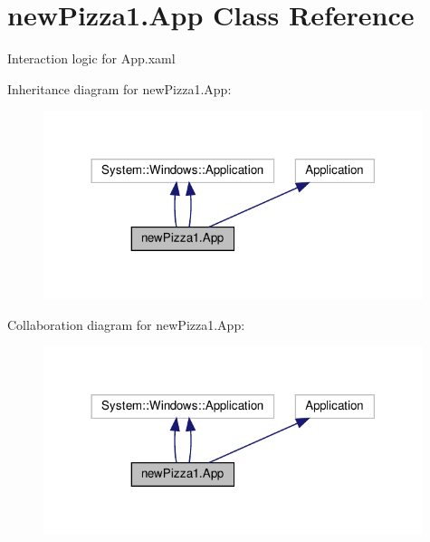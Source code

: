 \hypertarget{classnewPizza1_1_1App}{}\section{new\+Pizza1.\+App Class Reference}
\label{classnewPizza1_1_1App}


Interaction logic for App.\+xaml  




Inheritance diagram for new\+Pizza1.\+App\+:
\nopagebreak
\begin{figure}[H]
\begin{center}
\leavevmode
\includegraphics[width=314pt]{classnewPizza1_1_1App__inherit__graph}
\end{center}
\end{figure}


Collaboration diagram for new\+Pizza1.\+App\+:
\nopagebreak
\begin{figure}[H]
\begin{center}
\leavevmode
\includegraphics[width=314pt]{classnewPizza1_1_1App__coll__graph}
\end{center}
\end{figure}
